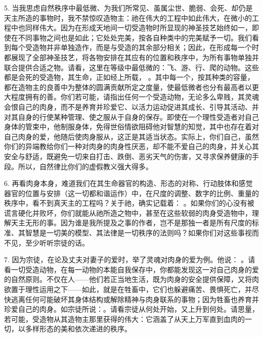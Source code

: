 5. 当我思虑自然秩序中最低微、为我们所常见、虽属尘世、脆弱、会死、却仍是天主所造的事物时，我不禁惊叹造物主：祂在伟大的工程中如此伟大，在微小的工程中也同样伟大。因为在形成天地间一切受造物时所显现的神圣技艺始终如一，即使在不同事物之间也是如此；它处处完美，按各自种类中的完美赋予一切。我们看到每个受造物并非单独造作，而是与受造的其余部分相关；因此，在形成每一个时都展现了全部神圣技艺，将各物安排在其应有的位置和秩序中，为所有事物单独并联合提供合适之物。请看，这里在等级中最低微的：飞、游、行、爬的动物。这些都是会死的受造物，其生命，正如经上所载， 。其中每一个，按其种类的容量，都在造物主的良善中为整体的圆满贡献所定之度量，使最低微者也分有最高者以更大程度拥有的善。你们若可能，请指出任何一个受造动物，无论多么卑贱，其灵魂会恨自己的肉身，而不是养育并珍爱它、以活力运动促进其成长、引导其活动、并对其自身的行使某种管理、使之服从于自身的保存。即使在一个理性受造者对自己身体的管束中，他制服身体，免得世俗情欲阻碍他对智慧的知觉，其中也存在着对自己肉身的爱，他随后使肉身服从，这正是其适当状态。实际上，你们自己，虽然你们的异端教给你们一种对肉身的肉身性厌恶，却不能不爱自己的肉身，并关心其安全与舒适，既避免一切来自打击、跌倒、恶劣天气的伤害，又寻求保养健康的手段。所以，自然律比你们的虚假教义强大得多。\par

6. 再看肉身本身，难道我们在其生命器官的构造、形态的对称、行动肢体和感觉器官的位置与安排（这一切都和谐运作）中，在尺度的调整、数字的比例、重量的秩序中，看不到真天主的工程吗？关于祂，确实记载着： 。如果你们的心没有被谎言硬化并败坏，你们就能从祂所造之物中，甚至在这些软弱的肉身受造物中，理解天主无形的事。因为谁是我所提及之事的作者，岂不是那独一者是所有尺度的标准、其智慧是一切美的模型、其法律是一切秩序的法则吗？如果你们对这些事视而不见，至少听听宗徒的话。\par

7. 因为宗徒，在论及丈夫对妻子的爱时，举了灵魂对肉身的爱为例。他说： 。请看一切受造动物，在每一动物的本能自我保存中，你都能发现这一对自己肉身的爱的自然原则。不仅在人——他们若正当地生活，既为肉身的安全提供保障，又将肉欲置于理性运用之下——如此，就是在牲畜中，它们也躲避痛苦、畏惧死亡，并尽快逃离任何可能破坏其身体结构或解除精神与肉身联系的事物；因为牲畜也养育并珍爱自己的肉身。如宗徒所说：。请看宗徒从何处开始，又上升到何处。请思量，若可能，受造物从其造物主那里获得的伟大：它涵盖了从天上万军直到血肉的一切，以多样形态的美和依次递进的秩序。\par

